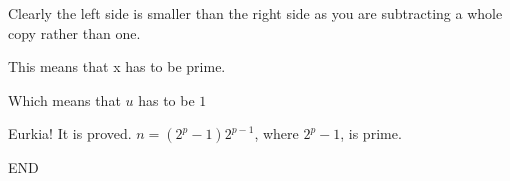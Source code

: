 \documentclass[10pt, AMS Euler]{article}
\begin{document}
\begin{enumerate}
        Clearly the left side is smaller than the right side as you are subtracting a whole copy rather than one.

        This means that x has to be prime.

        Which means that $u$ has to be $1$

        Eurkia! It is proved. $n = (2^p-1)2^{p-1}$, where $2^p -1$, is prime.

        END




  
		
	\end{enumerate}
	
	\noindent \underline{\hspace{3in}}\\
	
	
	
	
\end{document}
